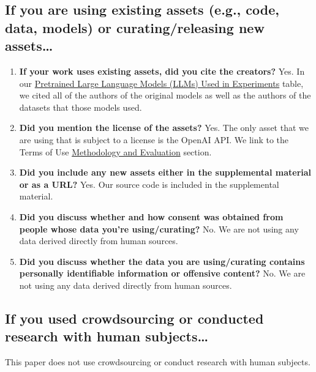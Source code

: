 \documentclass{article}
\begin{document}
\subsection{If you are using existing assets (e.g., code, data, models) or curating/releasing new assets\dots}
\begin{enumerate}
  \item \textbf{If your work uses existing assets, did you cite the creators?} Yes. In our   \hyperref[tab:llms]{Pretrained Large Language Models (LLMs) Used in Experiments} table, we cited all of the authors of the original models as well as the authors of the datasets that those models used.
  \item \textbf{Did you mention the license of the assets?} Yes. The only asset that we are using that is subject to a license is the OpenAI API. We link to the Terms of Use \hyperref[para:methodology]{Methodology and Evaluation} section.
  \item \textbf{Did you include any new assets either in the supplemental material or as a URL?} Yes. Our source code is included in the supplemental material.
  \item \textbf{Did you discuss whether and how consent was obtained from people whose data you're using/curating?} No. We are not using any data derived directly from human sources.
  \item \textbf{Did you discuss whether the data you are using/curating contains personally identifiable information or offensive content?} No.  We are not using any data derived directly from human sources.
\end{enumerate}
\subsection{If you used crowdsourcing or conducted research with human subjects\dots}
This paper does not use crowdsourcing or conduct research with human subjects.

\printbibliography{}
\end{document}
